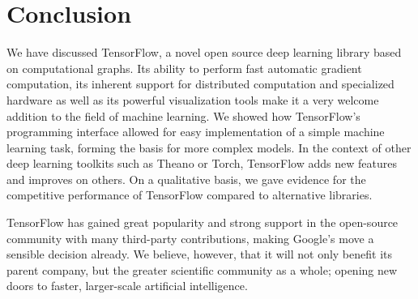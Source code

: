 \section{Conclusion}\label{sec:conclusion}

We have discussed TensorFlow, a novel open source deep learning library based on
computational graphs. Its ability to perform fast automatic gradient
computation, its inherent support for distributed computation and specialized
hardware as well as its powerful visualization tools make it a very welcome
addition to the field of machine learning. We showed how TensorFlow's
programming interface allowed for easy implementation of a simple machine
learning task, forming the basis for more complex models. In the context of
other deep learning toolkits such as Theano or Torch, TensorFlow adds new
features and improves on others. On a qualitative basis, we gave evidence for
the competitive performance of TensorFlow compared to alternative libraries.

TensorFlow has gained great popularity and strong support in the open-source
community with many third-party contributions, making Google's move a sensible
decision already. We believe, however, that it will not only benefit its parent
company, but the greater scientific community as a whole; opening new doors to
faster, larger-scale artificial intelligence.

